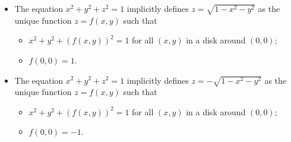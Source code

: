 

\begin{frame}
\begin{itemize}
\item The equation $x^2+y^2+z^2 = 1$ implicitly defines $z=\sqrt{1-x^2 -y^2 }$ as the unique function $z=f(x,y)$ such that

\begin{itemize}
\item $x^2+ y^2+(f(x,y))^2 = 1$ for all $(x,y)$ in a disk around $(0,0)$;
\item $f(0,0) = 1$.
\end{itemize}
\item The equation $x^2+y^2+z^2 = 1$ implicitly defines $z=-\sqrt{1 -x^2- y^2 }$ as the unique function $z=f(x,y)$ such that
%
\begin{itemize}
\item $x^2+ y^2+(f(x,y))^2 = 1$ for all $(x,y)$ in a disk around $(0,0)$;
\item $f(0,0) = -1$.
\end{itemize}
\end{itemize}


\end{frame}